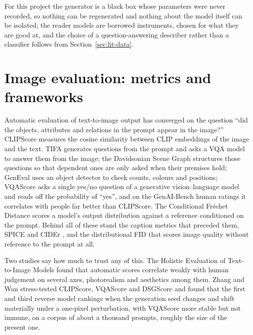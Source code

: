 For this project the generator is a black box whose parameters were never recorded, so nothing can be regenerated and nothing about the model itself can be isolated; the reader models are borrowed instruments, chosen for what they are good at, and the choice of a question-answering describer rather than a classifier follows from Section~\ref{sec:lit-data}.

\section{Image evaluation: metrics and frameworks}
\label{sec:lit-eval}

Automatic evaluation of text-to-image output has converged on the question ``did the objects, attributes and relations in the prompt appear in the image?'' CLIPScore \cite{hessel2021clipscore} measures the cosine similarity between CLIP embeddings of the image and the text. TIFA \cite{hu2023tifa} generates questions from the prompt and asks a VQA model to answer them from the image; the Davidsonian Scene Graph \cite{cho2024davidsonian} structures those questions so that dependent ones are only asked when their premises hold; GenEval \cite{ghosh2023geneval} uses an object detector to check counts, colours and positions; VQAScore \cite{lin2024evaluating, li2024evaluating} asks a single yes/no question of a generative vision--language model and reads off the probability of ``yes'', and on the GenAI-Bench human ratings it correlates with people far better than CLIPScore. The Conditional Fr\'echet Distance \cite{koo2026evaluating} scores a model's output distribution against a reference conditioned on the prompt. Behind all of these stand the caption metrics that preceded them, SPICE \cite{anderson2016spice} and CIDEr \cite{vedantam2015cider}, and the distributional FID \cite{heusel2017gans} that scores image quality without reference to the prompt at all.

Two studies say how much to trust any of this. The Holistic Evaluation of Text-to-Image Models \cite{lee2023holistic} found that automatic scores correlate weakly with human judgement on several axes, photorealism and aesthetics among them. Zhang and Wan \cite{zhang2025rethinking} stress-tested CLIPScore, VQAScore and DSGScore and found that the first and third reverse model rankings when the generation seed changes and shift materially under a one-pixel perturbation, with VQAScore more stable but not immune, on a corpus of about a thousand prompts, roughly the size of the present one.

